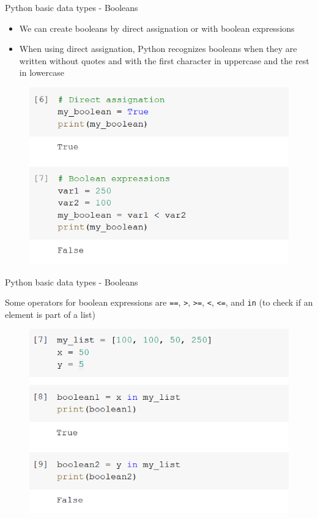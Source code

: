 \documentclass[aspectratio=169]{beamer}
\begin{document}
\begin{frame}{Python basic data types - Booleans}

	\begin{itemize}	
		\item We can create booleans by direct assignation or with boolean expressions
		\item When using direct assignation, Python recognizes booleans when they are written without quotes and with the first character in uppercase and the rest in lowercase
	\end{itemize}

	\begin{figure}
		\centering
		\includegraphics[width=0.5\linewidth]{img/bool_assignation.png}
	\end{figure}

\end{frame}

\begin{frame}{Python basic data types - Booleans}

	Some operators for boolean expressions are \texttt{==}, \texttt{>}, \texttt{>=}, \texttt{<}, \texttt{<=}, and \texttt{in} (to check if an element is part of a list)

	\begin{figure}
		\centering
		\includegraphics[width=0.6\linewidth]{img/bool_in.png}
	\end{figure}

\end{frame}
\end{document}
